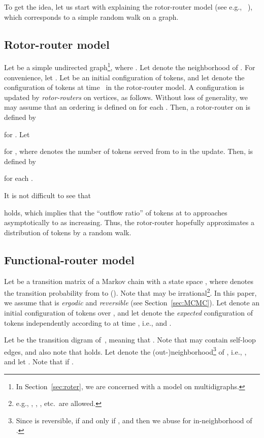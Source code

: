 \documentclass[letter, 11pt]{article}
\newcommand{\1}{\mbox{1}\hspace{-0.25em}\mbox{l}}
\begin{document}
To get the idea, 
  let us start 
   with explaining the rotor-router model (see e.g., ~\cite{CS06, KKM12}), 
   which corresponds to a simple random walk on a graph. 
\subsection{Rotor-router model}\label{sec:rotor-router}
Let  be a simple undirected graph\footnote{
  In Section~\ref{sec:roter}, we are concerned with a model on multidigraphs. 
}, where . 
 Let  denote 
  the neighborhood of . 
 For convenience, 
  let . 
 Let  be an initial configuration of tokens, and  
 let  denote the configuration of tokens 
   at time~ in the rotor-router model. 
 A configuration  
   is updated by {\em rotor-routers} on vertices, as follows. 
 Without loss of generality, 
   we may assume that an ordering  is defined on  for each . 
 Then, a rotor-router  on  is defined by 

 for . 
 Let

  for , 
 where  denotes the number of tokens served from  to  in the update. 
 Then,  is defined by 

  for each . 

It is not difficult to see that 

  holds, which implies that  
  the ``outflow ratio'' 
    of tokens at  to  
 approaches asymptotically to  as  increasing. 
 Thus, the rotor-router hopefully approximates a distribution of tokens by a random walk. 

\subsection{Functional-router model}\label{sec:fr-model}Let  be 
   a transition matrix of a Markov chain with a state space , 
  where  denotes the transition probability from  to  (). 
 Note that  may be irrational\footnote{  
     e.g., , , , etc.~are allowed.
  }.
 In this paper, we assume that  is {\em ergodic} and {\em reversible} (see Section~\ref{sec:MCMC}). 
Let  
   denote an initial configuration of  tokens over , and 
 let  
   denote the {\em expected} configuration of tokens 
   independently according to  at time , 
   i.e.,  and . 

Let  be the transition digram of~, 
  meaning that . 
 Note that  may contain self-loop edges, and also 
 note that  holds. 
 Let  denote 
  the (out-)neighborhood\footnote{
 Since  is reversible, 
   if and only if , and then 
  we abuse  for in-neighborhood of . 
} of , 
  i.e., , and  
 let . 
 Note that  if . 
\end{document}
